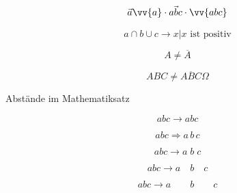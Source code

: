 \documentclass[ngerman,12pt]{scrreprt}
\begin{document}

\[ \vec{a} \vv{a}  \cdot \vec{abc} \cdot \vv{abc} \]

\[  a \cap b  \cup c \rightarrow {x | x \text{ ist positiv}} \]

\[ A \not= \overline{A} \]

\[ ABC \not= \overline{ABC}  \Omega \]


Abstände im Mathematiksatz

\[ a b c \rightarrow abc \]

\[ a b c \Rightarrow a\,b\,c \]

\[ a b c \rightarrow a\;b\;c \]


\[ a b c \rightarrow a\quad b\quad c \]

\[ a b c \rightarrow a\qquad b\qquad c \]
\end{document}
